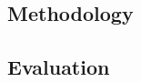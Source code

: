 \documentclass{article}
\begin{document}
\subsection{Methodology}

\subsection{Evaluation}
\end{document}
